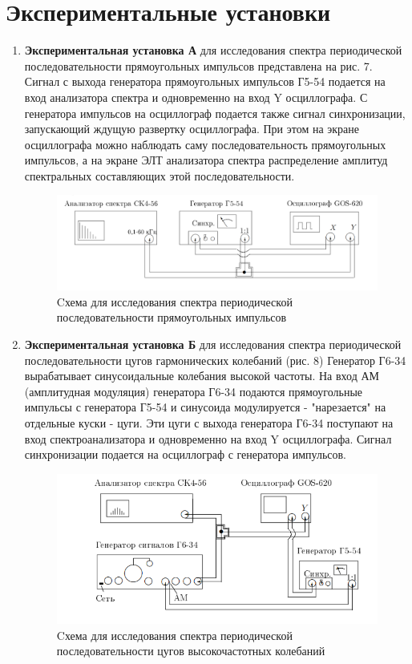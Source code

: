 \documentclass[12pt]{kiarticle}
\begin{document}
	\section{Экспериментальные установки}
	
	\begin{enumerate}
		
		\item \textbf{Экспериментальная установка А} для исследования спектра периодической последовательности прямоугольных импульсов представлена на рис. 7. Сигнал с выхода генератора прямоугольных импульсов Г5-54 подается на
		вход анализатора спектра и одновременно  на вход Y осциллографа. С генератора импульсов на осциллограф подается также сигнал синхронизации, запускающий ждущую развертку осциллографа. При этом на экране осциллографа можно наблюдать саму последовательность прямоугольных импульсов, а на экране ЭЛТ анализатора спектра  распределение амплитуд спектральных составляющих этой последовательности.
		
					
		\begin{figure}[h!]
			\centering
			\includegraphics[width=\linewidth]{sp7.png}
			\caption{Cхема для исследования спектра периодической последовательности прямоугольных импульсов}
			\label{A}
		\end{figure}
			
		\item \textbf{Экспериментальная установка Б} для исследования спектра периодической последовательности цугов гармонических колебаний (рис. 8) Генератор Г6-34 вырабатывает синусоидальные колебания высокой частоты. На вход АМ (амплитудная модуляция) генератора Г6-34 подаются прямоугольные импульсы с генератора Г5-54 и синусоида модулируется - "нарезается" на отдельные куски - цуги. Эти цуги с выхода генератора Г6-34 поступают на вход спектроанализатора и одновременно на вход Y осциллографа. Сигнал синхронизации подается на осциллограф с генератора импульсов.
		
		\newpage
		
		\begin{figure}[h]
			\centering
			\includegraphics[width=0.8\linewidth]{sp8.png}
			\caption{Cхема для исследования спектра периодической последовательности цугов высокочастотных колебаний}
			\label{B}
		\end{figure}
		

\end{enumerate}
\end{document}
